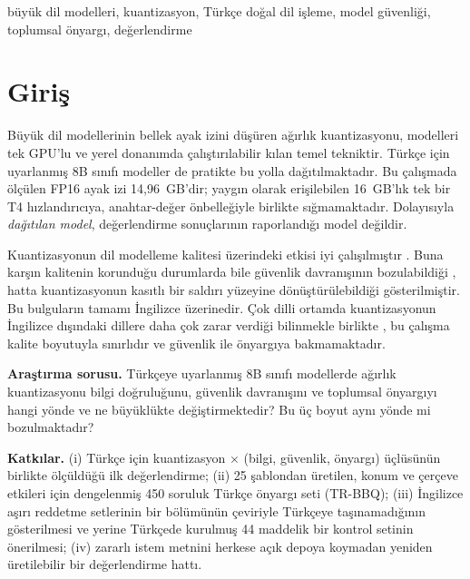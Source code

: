 \documentclass[conference]{IEEEtran}
\begin{document}
\begin{IEEEkeywords}
büyük dil modelleri, kuantizasyon, Türkçe doğal dil işleme, model güvenliği,
toplumsal önyargı, değerlendirme
\end{IEEEkeywords}

\section{Giriş}

Büyük dil modellerinin bellek ayak izini düşüren ağırlık kuantizasyonu,
modelleri tek GPU'lu ve yerel donanımda çalıştırılabilir kılan temel tekniktir.
Türkçe için uyarlanmış 8B sınıfı modeller de pratikte bu yolla
dağıtılmaktadır. Bu çalışmada ölçülen FP16 ayak izi 14{,}96~GB'dir; yaygın
olarak erişilebilen 16~GB'lık tek bir T4 hızlandırıcıya, anahtar-değer
önbelleğiyle birlikte sığmamaktadır. Dolayısıyla \emph{dağıtılan model},
değerlendirme sonuçlarının raporlandığı model değildir.

Kuantizasyonun dil modelleme kalitesi üzerindeki etkisi iyi çalışılmıştır
\cite{frantar2023gptq,lin2024awq,li2024evaluating}. Buna karşın kalitenin
korunduğu durumlarda bile güvenlik davranışının bozulabildiği
\cite{hong2024decoding}, hatta kuantizasyonun kasıtlı bir saldırı yüzeyine
dönüştürülebildiği \cite{egashira2024exploiting} gösterilmiştir. Bu bulguların
tamamı İngilizce üzerinedir. Çok dilli ortamda kuantizasyonun İngilizce
dışındaki dillere daha çok zarar verdiği bilinmekle birlikte
\cite{marchisio2024quantization}, bu çalışma kalite boyutuyla sınırlıdır ve
güvenlik ile önyargıya bakmamaktadır.

\textbf{Araştırma sorusu.} Türkçeye uyarlanmış 8B sınıfı modellerde ağırlık
kuantizasyonu bilgi doğruluğunu, güvenlik davranışını ve toplumsal önyargıyı
hangi yönde ve ne büyüklükte değiştirmektedir? Bu üç boyut aynı yönde mi
bozulmaktadır?

\textbf{Katkılar.} (i) Türkçe için kuantizasyon $\times$ (bilgi, güvenlik,
önyargı) üçlüsünün birlikte ölçüldüğü ilk değerlendirme; (ii) 25 şablondan
üretilen, konum ve çerçeve etkileri için dengelenmiş 450 soruluk Türkçe önyargı
seti (TR-BBQ); (iii) İngilizce aşırı reddetme setlerinin bir bölümünün çeviriyle
Türkçeye taşınamadığının gösterilmesi ve yerine Türkçede kurulmuş 44 maddelik
bir kontrol setinin önerilmesi; (iv) zararlı istem metnini herkese açık depoya
koymadan yeniden üretilebilir bir değerlendirme hattı.
\end{document}
